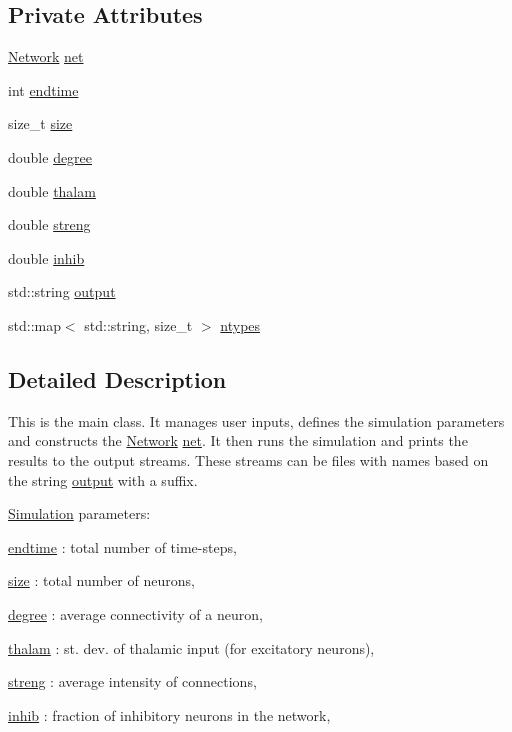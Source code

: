 \subsection*{Private Attributes}
\begin{DoxyCompactItemize}
\item 
\hyperlink{classNetwork}{Network} \hyperlink{classSimulation_a980a224fe68945549f217067ffc74f7c}{net}
\item 
int \hyperlink{classSimulation_ae57735a4ad942d9d217fb2235a644d1b}{endtime}
\item 
size\+\_\+t \hyperlink{classSimulation_ae198f9ac020ed6bc6ebbd608ab3f959d}{size}
\item 
double \hyperlink{classSimulation_ad0197878662d63d3ad1699aa7ffe01b2}{degree}
\item 
double \hyperlink{classSimulation_a7fca2f5f79a662f91736b0e5f30598c1}{thalam}
\item 
double \hyperlink{classSimulation_adfda098679d8fcb864ecd87409087d02}{streng}
\item 
double \hyperlink{classSimulation_a14c04fb020df35f875b1f5b2aab7a562}{inhib}
\item 
std\+::string \hyperlink{classSimulation_a9ad4c807c6ddf9066041f764f0ccb9dc}{output}
\item 
std\+::map$<$ std\+::string, size\+\_\+t $>$ \hyperlink{classSimulation_a445d67187d6cc08c4c098ca498ee87d7}{ntypes}
\end{DoxyCompactItemize}


\subsection{Detailed Description}
This is the main class. It manages user inputs, defines the simulation parameters and constructs the \hyperlink{classNetwork}{Network} \hyperlink{classSimulation_a980a224fe68945549f217067ffc74f7c}{net}. It then runs the simulation and prints the results to the output streams. These streams can be files with names based on the string \hyperlink{classSimulation_a9ad4c807c6ddf9066041f764f0ccb9dc}{output} with a suffix.

\hyperlink{classSimulation}{Simulation} parameters\+:
\begin{DoxyItemize}
\item \hyperlink{classSimulation_ae57735a4ad942d9d217fb2235a644d1b}{endtime} \+: total number of time-\/steps,
\item \hyperlink{classSimulation_ae198f9ac020ed6bc6ebbd608ab3f959d}{size} \+: total number of neurons,
\item \hyperlink{classSimulation_ad0197878662d63d3ad1699aa7ffe01b2}{degree} \+: average connectivity of a neuron,
\item \hyperlink{classSimulation_a7fca2f5f79a662f91736b0e5f30598c1}{thalam} \+: st. dev. of thalamic input (for excitatory neurons),
\item \hyperlink{classSimulation_adfda098679d8fcb864ecd87409087d02}{streng} \+: average intensity of connections,
\item \hyperlink{classSimulation_a14c04fb020df35f875b1f5b2aab7a562}{inhib} \+: fraction of inhibitory neurons in the network,
\end{DoxyItemize}

